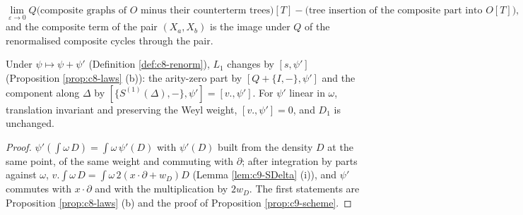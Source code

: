 \begin{definition}
\[
\lim_{\varepsilon\to0}Q\big(\text{composite graphs of }O\text{ minus their counterterm trees}\big)[T]-\big(\text{tree insertion of the composite part into }O[T]\big),
\]
and the composite term of the pair $(X_a,X_b)$ is the image under $Q$ of the renormalised composite cycles through the pair.
\end{definition}

\begin{lemma}
\label{lem:c10-psi}
Under $\psi\mapsto\psi+\psi'$ (Definition \ref{def:c8-renorm}), $L_1$ changes by $[s,\psi']$ (Proposition \ref{prop:c8-laws} (b)): the arity-zero part by $[Q+\{I,-\},\psi']$ and the component along $\Delta$ by $[\{S^{(1)}(\Delta),-\},\psi']=[v.,\psi']$. For $\psi'$ linear in $\omega$, translation invariant and preserving the Weyl weight, $[v.,\psi']=0$, and $D_1$ is unchanged.
\end{lemma}

\begin{proof}
$\psi'(\int\omega\,D)=\int\omega\,\psi'(D)$ with $\psi'(D)$ built from the density $D$ at the same point, of the same weight and commuting with $\partial$; after integration by parts against $\omega$, $v.\int\omega\,D=\int\omega\,2(x\cdot\partial+w_D)D$ (Lemma \ref{lem:c9-SDelta} (i)), and $\psi'$ commutes with $x\cdot\partial$ and with the multiplication by $2w_D$. The first statements are Proposition \ref{prop:c8-laws} (b) and the proof of Proposition \ref{prop:c9-scheme}.
\end{proof}

